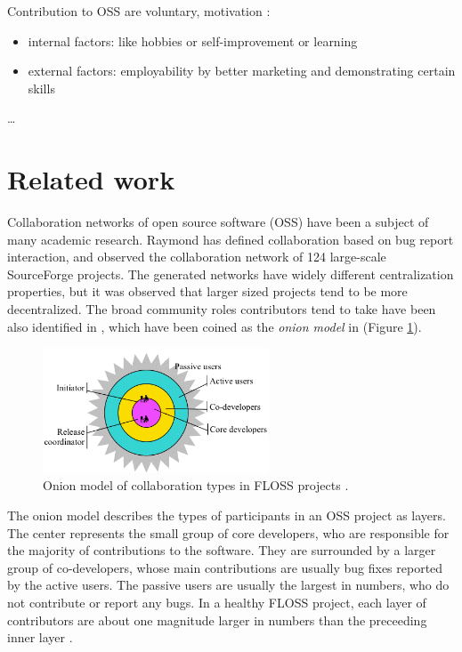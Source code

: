 Contribution to OSS are voluntary, motivation \cite{elasriPeripheryCoreTemporal2017}:
\begin{itemize}
    \item internal factors: like hobbies or self-improvement \cite{alexanderharsWorkingFreeMotivations2002} or learning \cite{yunwenyeUnderstandingMotivationOpen2003}
    \item external factors: employability by better marketing and demonstrating certain skills \cite{alexanderharsWorkingFreeMotivations2002}
\end{itemize}
\dots

\section{Related work}

Collaboration networks of open source software (OSS) have been a subject of many academic research. Raymond \cite{crowstonSocialStructureFree2005} has defined collaboration based on bug report interaction, and observed the collaboration network of 124 large-scale SourceForge projects. The generated networks have widely different centralization properties, but it was observed that larger sized projects tend to be more decentralized. The broad community roles contributors tend to take have been also identified in \cite{crowstonSocialStructureFree2005}, which have been coined as the \textit{onion model} in \cite{martinez-romoUsingSocialNetwork2008} (Figure \ref{fig:onion1}). \\

\begin{figure}
    \centering
    \includegraphics[width=0.6\textwidth]{figures/onion_model.png}
    \caption{Onion model of collaboration types in FLOSS projects \cite{crowstonSocialStructureFree2005}.}
    \label{fig:onion1}
\end{figure}

The onion model describes the types of participants in an OSS project as layers. The center represents the small group of core developers, who are responsible for the majority of contributions to the software. They are surrounded by a larger group of co-developers, whose main contributions are usually bug fixes reported by the active users. The passive users are usually the largest in numbers, who do not contribute or report any bugs. In a healthy FLOSS project, each layer of contributors are about one magnitude larger in numbers than the preceeding inner layer \cite{mockusTwoCaseStudies2002}. \\

